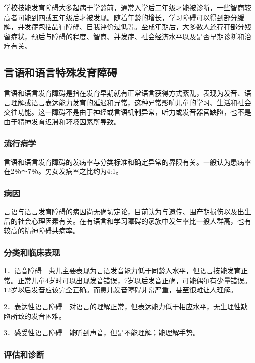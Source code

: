 学校技能发育障碍大多起病于学龄前，通常入学后二年级才能被诊断，一些智商较高者可能到四或五年级后才被发现。随着年龄的增长，学习障碍可以得到部分缓解，并发症包括品行障碍、自我评价过低等。至成年期后，大多数人还存在部分残留症状，预后与障碍的程度、智商、并发症、社会经济水平以及是否早期诊断和治疗有关。

\subsection{言语和语言特殊发育障碍}

言语和语言发育障碍是指在发育早期就有正常语言获得方式紊乱，表现为发音、语言理解或语言表达能力发育的延迟和异常，这种异常影响儿童的学习、生活和社会交往功能。这一障碍不是由于神经或言语机制异常，听力或发音器官缺陷，也不是由于精神发育迟滞和环境因素所导致。

\subsubsection{流行病学}

言语和语言发育障碍的发病率与分类标准和确定异常的界限有关。一般认为患病率在2％～7％。男女发病率之比约为4:1。

\subsubsection{病因}

言语与语言发育障碍的病因尚无确切定论，目前认为与遗传、围产期损伤以及出生后的社会心理因素有关。在有语言和学习障碍的家族中发生率比一般人群高，也有较高的精神障碍共病率。

\subsubsection{分类和临床表现}

1．语音障碍　患儿主要表现为言语发音能力低于同龄人水平，但语言技能发育正常。正常儿童4岁时可以出现发音错误，7岁以后发音正确，可能偶尔有少量错误。12岁以后发音应该完全正确。而患儿发音障碍非常严重，甚至很难让人理解。

2．表达性语言障碍　对语言的理解正常，但表达能力低于相应水平，无生理性缺陷所致的发音困难。

3．感受性语言障碍　能听到声音，但是不能理解；能理解手势。

\subsubsection{评估和诊断}

